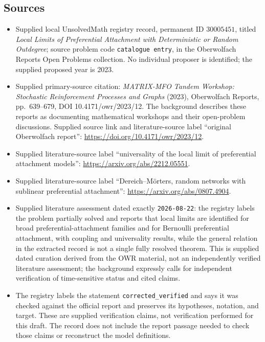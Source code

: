 \documentclass[11pt]{article}
\begin{document}
\subsection{Sources}
\begin{itemize}
\item Supplied local UnsolvedMath registry record, permanent ID \(30005451\), titled \emph{Local Limits of Preferential Attachment with Deterministic or Random Outdegree}; source problem code \texttt{catalogue entry}, in the Oberwolfach Reports Open Problems collection. No individual proposer is identified; the supplied proposed year is 2023.
\item Supplied primary-source citation: \emph{MATRIX-MFO Tandem Workshop: Stochastic Reinforcement Processes and Graphs} (2023), Oberwolfach Reports, pp.\ 639--679, DOI 10.4171/owr/2023/12. The background describes these reports as documenting mathematical workshops and their open-problem discussions. Supplied source link and literature-source label ``original Oberwolfach report'': \url{https://doi.org/10.4171/owr/2023/12}.
\item Supplied literature-source label ``universality of the local limit of preferential attachment models'': \url{https://arxiv.org/abs/2212.05551}.
\item Supplied literature-source label ``Dereich--Mörters, random networks with sublinear preferential attachment'': \url{https://arxiv.org/abs/0807.4904}.
\item Supplied literature assessment dated exactly \texttt{2026-08-22}: the registry labels the problem partially solved and reports that local limits are identified for broad preferential-attachment families and for Bernoulli preferential attachment, with coupling and universality results, while the general relation in the extracted record is not a single fully resolved theorem. This is supplied dated curation derived from the OWR material, not an independently verified literature assessment; the background expressly calls for independent verification of time-sensitive status and cited claims.
\item The registry labels the statement \texttt{corrected\_verified} and says it was checked against the official report and preserves its hypotheses, notation, and target. These are supplied verification claims, not verification performed for this draft. The record does not include the report passage needed to check those claims or reconstruct the model definitions.
\end{itemize}
\end{document}
